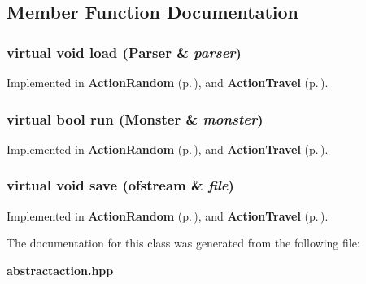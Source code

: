 \subsection{Member Function Documentation}
\subsubsection{\setlength{\rightskip}{0pt plus 5cm}virtual void load ({\bf Parser} \& {\em parser})\hspace{0.3cm}{\tt  [pure virtual]}}\label{classAbstractAction_a2}




Implemented in {\bf Action\-Random} {\rm (p.\,\pageref{classActionRandom_a2})}, and {\bf Action\-Travel} {\rm (p.\,\pageref{classActionTravel_a2})}.
\subsubsection{\setlength{\rightskip}{0pt plus 5cm}virtual bool run ({\bf Monster} \& {\em monster})\hspace{0.3cm}{\tt  [pure virtual]}}\label{classAbstractAction_a1}




Implemented in {\bf Action\-Random} {\rm (p.\,\pageref{classActionRandom_a1})}, and {\bf Action\-Travel} {\rm (p.\,\pageref{classActionTravel_a1})}.
\subsubsection{\setlength{\rightskip}{0pt plus 5cm}virtual void save (ofstream \& {\em file})\hspace{0.3cm}{\tt  [pure virtual]}}\label{classAbstractAction_a3}




Implemented in {\bf Action\-Random} {\rm (p.\,\pageref{classActionRandom_a3})}, and {\bf Action\-Travel} {\rm (p.\,\pageref{classActionTravel_a3})}.

The documentation for this class was generated from the following file:\begin{CompactItemize}
\item 
{\bf abstractaction.hpp}\end{CompactItemize}
